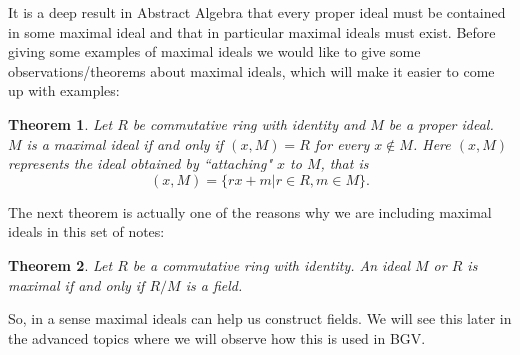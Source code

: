 \documentclass[12pt]{article}
\theoremstyle{plain}
\newtheorem{theorem}{Theorem}
\theoremstyle{definition}
\theoremstyle{remark}
\begin{document}
It is a deep result in Abstract Algebra that every proper ideal must be contained in some maximal ideal and that in particular maximal ideals must exist. Before giving some examples of maximal ideals we would like to give some observations/theorems about maximal ideals, which will make it easier to come up with examples:
\begin{theorem}
Let $R$ be commutative ring with identity and $M$ be a proper ideal. $M$ is a maximal ideal if and only if $(x,M)=R$ for every $x\not \in M$. Here $(x,M)$ represents the ideal obtained by ``attaching" $x$ to $M$, that is 
$$(x,M) = \{rx+m|r\in R, m\in M\}.$$
\end{theorem}
The next theorem is actually one of the reasons why we are including maximal ideals in this set of notes:
\begin{theorem}
Let $R$ be a commutative ring with identity. An ideal $M$ or $R$ is maximal if and only if $R/M$ is a field. 
\end{theorem}
So, in a sense maximal ideals can help us construct fields. We will see this later in the advanced topics where we will observe how this is used in BGV.
\end{document}
